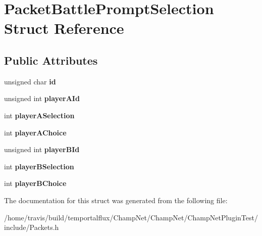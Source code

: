 \hypertarget{struct_packet_battle_prompt_selection}{\section{Packet\-Battle\-Prompt\-Selection Struct Reference}
\label{struct_packet_battle_prompt_selection}
}
\subsection*{Public Attributes}
\begin{DoxyCompactItemize}
\item 
\hypertarget{struct_packet_battle_prompt_selection_aaee299dad27b67f3a110f43bdb153483}{unsigned char {\bfseries id}}\label{struct_packet_battle_prompt_selection_aaee299dad27b67f3a110f43bdb153483}

\item 
\hypertarget{struct_packet_battle_prompt_selection_adf39f8101ce7fdca0cc6d6fcdd22c4b3}{unsigned int {\bfseries player\-A\-Id}}\label{struct_packet_battle_prompt_selection_adf39f8101ce7fdca0cc6d6fcdd22c4b3}

\item 
\hypertarget{struct_packet_battle_prompt_selection_afc4ee55b1a7dff6cb25bb47e2c517dea}{int {\bfseries player\-A\-Selection}}\label{struct_packet_battle_prompt_selection_afc4ee55b1a7dff6cb25bb47e2c517dea}

\item 
\hypertarget{struct_packet_battle_prompt_selection_abd26c08394d5c6e0bbadb794d07750e0}{int {\bfseries player\-A\-Choice}}\label{struct_packet_battle_prompt_selection_abd26c08394d5c6e0bbadb794d07750e0}

\item 
\hypertarget{struct_packet_battle_prompt_selection_aa7108e4202c67ac30571bc3083277727}{unsigned int {\bfseries player\-B\-Id}}\label{struct_packet_battle_prompt_selection_aa7108e4202c67ac30571bc3083277727}

\item 
\hypertarget{struct_packet_battle_prompt_selection_aa696c396d478697bdddf8c2394c1a0b7}{int {\bfseries player\-B\-Selection}}\label{struct_packet_battle_prompt_selection_aa696c396d478697bdddf8c2394c1a0b7}

\item 
\hypertarget{struct_packet_battle_prompt_selection_a68ff044c6f22f9aaaeb3aa2a8d12e2eb}{int {\bfseries player\-B\-Choice}}\label{struct_packet_battle_prompt_selection_a68ff044c6f22f9aaaeb3aa2a8d12e2eb}

\end{DoxyCompactItemize}


The documentation for this struct was generated from the following file\-:\begin{DoxyCompactItemize}
\item 
/home/travis/build/temportalflux/\-Champ\-Net/\-Champ\-Net/\-Champ\-Net\-Plugin\-Test/include/Packets.\-h\end{DoxyCompactItemize}
